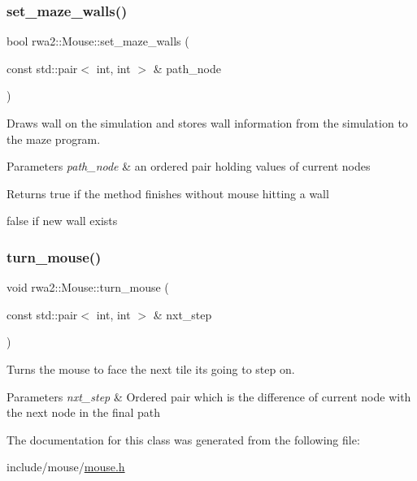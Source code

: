 \subsubsection{\texorpdfstring{set\+\_\+maze\+\_\+walls()}{set\_maze\_walls()}}
{\footnotesize\ttfamily bool rwa2\+::\+Mouse\+::set\+\_\+maze\+\_\+walls (\begin{DoxyParamCaption}\item[{const std\+::pair$<$ int, int $>$ \&}]{path\+\_\+node }\end{DoxyParamCaption})}



Draws wall on the simulation and stores wall information from the simulation to the maze program. 


\begin{DoxyParams}{Parameters}
{\em path\+\_\+node} & an ordered pair holding values of current nodes \\
\hline
\end{DoxyParams}
\begin{DoxyReturn}{Returns}
true if the method finishes without mouse hitting a wall 

false if new wall exists 
\end{DoxyReturn}
\mbox{\label{classrwa2_1_1_mouse_a496eaae99071570dfa4b9328e1462ce7}} 
\subsubsection{\texorpdfstring{turn\+\_\+mouse()}{turn\_mouse()}}
{\footnotesize\ttfamily void rwa2\+::\+Mouse\+::turn\+\_\+mouse (\begin{DoxyParamCaption}\item[{const std\+::pair$<$ int, int $>$ \&}]{nxt\+\_\+step }\end{DoxyParamCaption})}



Turns the mouse to face the next tile it\textquotesingle{}s going to step on. 


\begin{DoxyParams}{Parameters}
{\em nxt\+\_\+step} & Ordered pair which is the difference of current node with the next node in the final path \\
\hline
\end{DoxyParams}


The documentation for this class was generated from the following file\+:\begin{DoxyCompactItemize}
\item 
include/mouse/\hyperlink{mouse_8h}{mouse.\+h}\end{DoxyCompactItemize}
